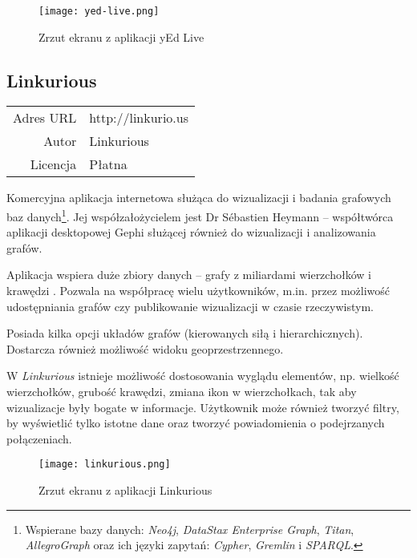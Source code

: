 \begin{figure}[H]
\caption{Zrzut ekranu z aplikacji yEd Live}
\centering
\texttt{[image: yed-live.png]}
\end{figure}


\subsection*{Linkurious}
\bigskip
\noindent\begin{tabularx}{\textwidth}{r|X|}
\cline{2-2}
  Adres URL & http://linkurio.us \\ 
\cline{2-2} 
 Autor & Linkurious\\ 
\cline{2-2}
 Licencja & Płatna\\ 
\cline{2-2}
\end{tabularx}
\bigskip

Komercyjna aplikacja internetowa służąca do wizualizacji i badania grafowych baz danych\footnote{Wspierane bazy danych: \textit{Neo4j}, \textit{DataStax Enterprise Graph}, \textit{Titan}, \textit{AllegroGraph} oraz ich języki zapytań: \textit{Cypher}, \textit{Gremlin} i \textit{SPARQL}.}. Jej współzałożycielem jest Dr Sébastien Heymann -- współtwórca aplikacji desktopowej Gephi służącej również do wizualizacji i analizowania grafów. 

Aplikacja wspiera duże zbiory danych -- grafy z miliardami wierzchołków i krawędzi \cite{linkurious}. Pozwala na współpracę wielu użytkowników, m.in. przez możliwość udostępniania grafów czy publikowanie wizualizacji w czasie rzeczywistym. 

Posiada kilka opcji układów grafów (kierowanych siłą i hierarchicznych). Dostarcza również możliwość widoku geoprzestrzennego. 

W \textit{Linkurious} istnieje możliwość dostosowania wyglądu elementów, np. wielkość wierzchołków, grubość krawędzi, zmiana ikon w wierzchołkach, tak aby wizualizacje były bogate w informacje. Użytkownik może również tworzyć filtry, by wyświetlić tylko istotne dane oraz tworzyć powiadomienia o podejrzanych połączeniach. 

\begin{figure}[H]
\caption{Zrzut ekranu z aplikacji Linkurious}
\centering
\texttt{[image: linkurious.png]}
\end{figure}

